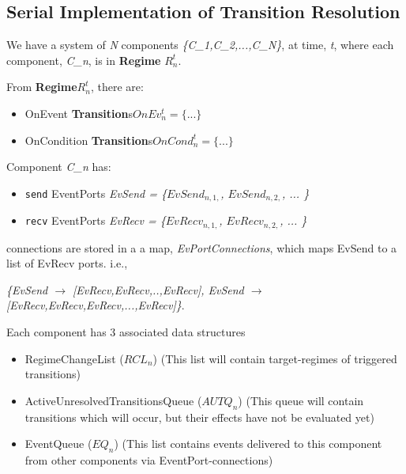 \documentclass{article}
\newcommand{\EventPort}{{\bf{EventPort}}\xspace}
\newcommand{\Regime}{{\bf{Regime}}\xspace}
\newcommand{\Transitions}{{\bf{Transition}}s\xspace}
\begin{document}
\subsection{Serial Implementation of Transition Resolution}

\newcommand{\CN}[0]{\textsl{C\_n}}

We have a system of \textsl{N} components \textsl{\{C\_1,C\_2,...,C\_N\}},
at time, \textsl{t}, where each component, \CN, is in \Regime
$R^{t}_{n}$.

\noindent From \Regime $R^{t}_{n}$, there are:
\begin{itemize}
\item OnEvent \Transitions $OnEv^{t}_{n} = \{ ... \}$
\item OnCondition \Transitions $OnCond^{t}_{n} = \{ ... \}$
\end{itemize}

\newcommand{\send}[0]{\texttt{send} }
\newcommand{\recv}[0]{\texttt{recv} }

\noindent Component \CN
has:
\begin{itemize}
\item \send EventPorts \textsl{EvSend = \{$EvSend_{n,1,}$, $EvSend_{n,2,}$, ... \}}
\item \recv EventPorts \textsl{EvRecv = \{$EvRecv_{n,1,}$, $EvRecv_{n,2,}$, ... \}}
\end{itemize}

\noindent \EventPort connections are stored in a a map,
\textsl{EvPortConnections}, which maps EvSend to a list of EvRecv ports. i.e.,

\textsl{\{EvSend $\rightarrow$ [EvRecv,EvRecv,..,EvRecv], EvSend $\rightarrow$
[EvRecv,EvRecv,EvRecv,...,EvRecv]\}}.

\newcommand{\RCLn}{$RCL_n$}
\newcommand{\AUTQn}{$AUTQ_n$}
\newcommand{\EQn}{$EQ_n$}

\noindent Each component has 3 associated data structures
\begin{itemize}
\item RegimeChangeList (\RCLn) (This list will contain target-regimes of
triggered transitions)
\item ActiveUnresolvedTransitionsQueue (\AUTQn) (This queue will
contain transitions which will occur, but their effects have not be
evaluated yet)
\item EventQueue (\EQn) (This list contains events delivered to this
component from other components via EventPort-connections)
\end{itemize}
\end{document}
